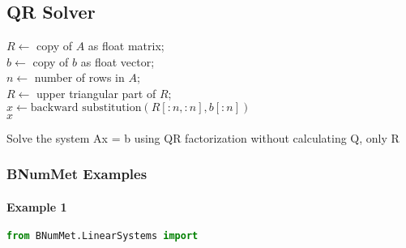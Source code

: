 \subsection{QR Solver}
\begin{algorithm}[H]
\SetAlgoLined
\DontPrintSemicolon
{}
$R \gets$ copy of $A$ as float matrix;\\
$b \gets$ copy of $b$ as float vector;\\
$n \gets$ number of rows in $A$;\\
$R \gets$ upper triangular part of $R$;\\
$x \gets \text{backward substitution}(R[:n,:n], b[:n])$\\
\Return $x$
\caption{Solve the system Ax = b using QR factorization without calculating Q, only R}
\end{algorithm}
\subsubsection{BNumMet Examples}
\paragraph{Example 1}{
\begin{lstlisting}[language=Python]
from BNumMet.LinearSystems import 

\end{lstlisting}
}